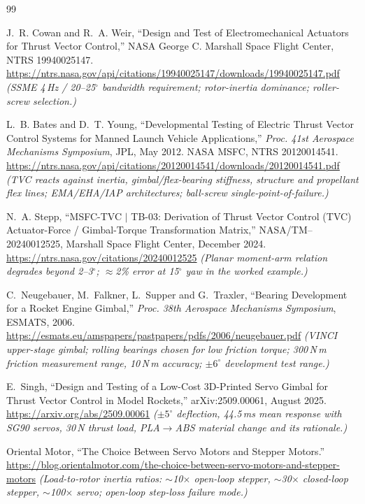 \documentclass[11pt]{article}
\begin{document}
\begin{thebibliography}{99}
\small

 J.~R. Cowan and R.~A. Weir,
``Design and Test of Electromechanical Actuators for Thrust Vector Control,''
NASA George C. Marshall Space Flight Center, NTRS 19940025147.
\url{https://ntrs.nasa.gov/api/citations/19940025147/downloads/19940025147.pdf}
\emph{(SSME 4\,Hz / 20--25$^\circ$ bandwidth requirement; rotor-inertia
dominance; roller-screw selection.)}

 L.~B. Bates and D.~T. Young,
``Developmental Testing of Electric Thrust Vector Control Systems for Manned
Launch Vehicle Applications,'' \emph{Proc. 41st Aerospace Mechanisms
Symposium}, JPL, May 2012. NASA MSFC, NTRS 20120014541.
\url{https://ntrs.nasa.gov/api/citations/20120014541/downloads/20120014541.pdf}
\emph{(TVC reacts against inertia, gimbal/flex-bearing stiffness, structure
and propellant flex lines; EMA/EHA/IAP architectures; ball-screw
single-point-of-failure.)}

 N.~A. Stepp,
``MSFC-TVC $|$ TB-03: Derivation of Thrust Vector Control (TVC)
Actuator-Force / Gimbal-Torque Transformation Matrix,''
NASA/TM--20240012525, Marshall Space Flight Center, December 2024.
\url{https://ntrs.nasa.gov/citations/20240012525}
\emph{(Planar moment-arm relation degrades beyond 2--3$^\circ$; $\approx$2\%
error at 15$^\circ$ yaw in the worked example.)}

 C.~Neugebauer, M.~Falkner, L.~Supper and G.~Traxler,
``Bearing Development for a Rocket Engine Gimbal,''
\emph{Proc. 38th Aerospace Mechanisms Symposium}, ESMATS, 2006.
\url{https://esmats.eu/amspapers/pastpapers/pdfs/2006/neugebauer.pdf}
\emph{(VINCI upper-stage gimbal; rolling bearings chosen for low friction
torque; 300\,N\,m friction measurement range, 10\,N\,m accuracy;
$\pm6^\circ$ development test range.)}

 E.~Singh,
``Design and Testing of a Low-Cost 3D-Printed Servo Gimbal for Thrust Vector
Control in Model Rockets,'' arXiv:2509.00061, August 2025.
\url{https://arxiv.org/abs/2509.00061}
\emph{($\pm5^\circ$ deflection, 44.5\,ms mean response with SG90 servos,
30\,N thrust load, PLA$\to$ABS material change and its rationale.)}

 Oriental Motor,
``The Choice Between Servo Motors and Stepper Motors.''
\url{https://blog.orientalmotor.com/the-choice-between-servo-motors-and-stepper-motors}
\emph{(Load-to-rotor inertia ratios: $\sim$10$\times$ open-loop stepper,
$\sim$30$\times$ closed-loop stepper, $\sim$100$\times$ servo; open-loop
step-loss failure mode.)}


\end{thebibliography}
\end{document}
